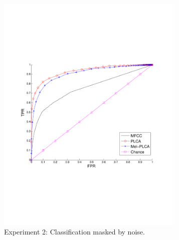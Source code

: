 \documentclass[a4paper,10pt,final]{ThesisStyle}
\begin{document}
\begin{figure}
\centering
	\begin{subfigure}[b]{0.48\textwidth}
		\centering
		\includegraphics[width=0.99\textwidth]{images/unknown-mixture-roc-results.pdf}
		\caption{Experiment 2: Classification masked by noise.}
		\label{fig:unknown-mixture-roc-results}
	\end{subfigure}%
        ~ %
      \begin{subfigure}[b]{0.48\textwidth}
      		\centering

\end{subfigure}
\end{figure}
\end{document}
